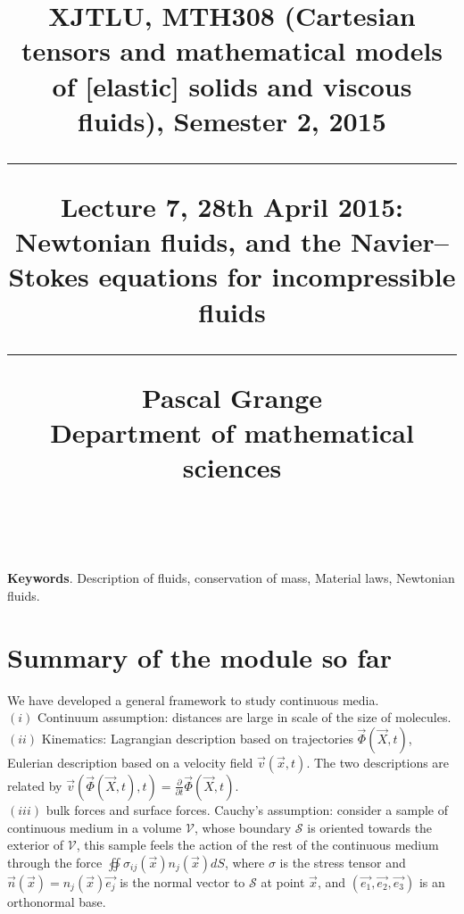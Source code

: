\documentclass[DIV=12]{article}
\newcommand{\eBase}{(\vec{e_1}, \vec{e_2},\vec{e_3})}
\newcommand{\surf}{{\mathcal{S}}}
\newcommand{\intSurf}{\oiint}
\begin{document}
\title{
\noindent\hrulefill
\begin{flushleft}
{\Large \bf{XJTLU, MTH308 (Cartesian tensors and mathematical models of [elastic] solids and viscous fluids), Semester 2, 2015\\
\vspace{8mm}
\hrule
\vspace{6mm}
 Lecture 7, 28th April 2015: Newtonian fluids, and the Navier--Stokes equations for incompressible fluids}}
\vspace{8mm}
\hrule
\vspace{6mm}
{\Large{Pascal Grange\\
Department of mathematical sciences\\
{}\\
}}
\noindent\hrulefill
\end{flushleft}}
\date{}
\author{}
\maketitle
\vspace{-9mm}
 
{\bf{Keywords}}. Description of fluids, conservation of mass, Material laws, Newtonian fluids.\\
\vspace{3mm}

\tableofcontents

\vspace{8mm}


\section{Summary of the module so far}

 We have developed a general framework to study  continuous media.\\
 $(i)$ Continuum assumption: distances are large in scale of the size of molecules.\\
 $(ii)$ Kinematics: Lagrangian description based on trajectories $\vec{\Phi}( \vec{X}, t )$, Eulerian description based on a velocity field $\vec{v}(\vec{x},t)$. The 
 two descriptions are related by $\vec{v}( \vec{\Phi}(\vec{X},t),t) = \frac{\partial}{\partial t} \vec{\Phi}(\vec{X},t)$.\\
 $(iii)$ bulk forces and surface forces. Cauchy's assumption: consider a sample of continuous medium
 in a volume $\mathcal{V}$, whose boundary $\surf$ is oriented towards the exterior of $\mathcal{V}$, this
 sample feels the action of the rest of the continuous medium through the force $\intSurf \sigma_{ij}( \vec{x}) n_j( \vec{x}) dS$,
 where $\sigma$ is the stress tensor and $\vec{n}(\vec{x}) = n_j(\vec{x}) \vec{e_j}$ is the normal vector to $\surf$ at point $\vec{x}$, and
 $\eBase$ is an orthonormal base.\\
\end{document}
